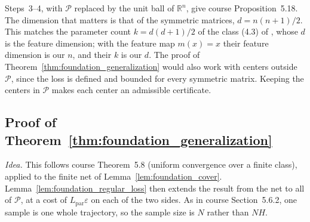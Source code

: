 Steps~3--4, with $\mathcal P$ replaced by the unit ball of $\mathbb R^n$,
give course Proposition~5.18. The dimension that matters is that of the
symmetric matrices, $d=n(n+1)/2$. This matches the parameter count
$k=d(d+1)/2$ of the class (4.3) of \citet{boffi2021learning}, whose $d$ is
the feature dimension; with the feature map $m(x)=x$ their feature
dimension is our $n$, and their $k$ is our $d$. The proof
of Theorem~\ref{thm:foundation_generalization} would also work with centers
outside $\mathcal P$, since the loss is defined and bounded for every
symmetric matrix. Keeping the centers in $\mathcal P$ makes each center an
admissible certificate.

\subsection{Proof of Theorem~\ref{thm:foundation_generalization}}
\label{subsec:proof_generalization}

\emph{Idea.} This follows course Theorem~5.8 (uniform convergence over a
finite class), applied to the finite net of Lemma~\ref{lem:foundation_cover}.
Lemma~\ref{lem:foundation_regular_loss} then extends the result from the net
to all of $\mathcal P$, at a cost of $L_{\mathrm{par}}\varepsilon$ on each
of the two sides. As in course Section~5.6.2, one sample is one whole
trajectory, so the sample size is $N$ rather than $NH$.


